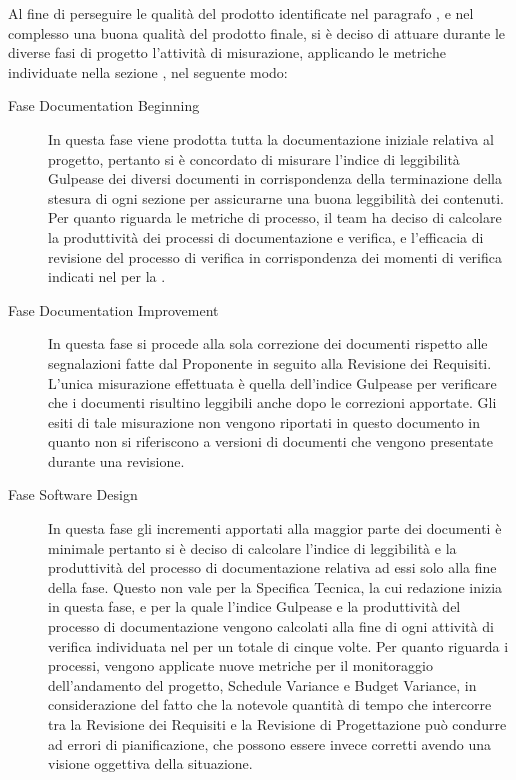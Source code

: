 		Al fine di perseguire le qualità del prodotto identificate nel paragrafo , e nel complesso una buona qualità del prodotto finale, si è deciso di attuare durante le diverse fasi di progetto l'attività di misurazione, applicando le metriche individuate nella sezione , nel seguente modo:
		\begin{description}
		\item[Fase Documentation Beginning] In questa fase viene prodotta tutta la documentazione iniziale relativa al progetto, pertanto si è concordato di misurare l'indice di leggibilità Gulpease dei diversi documenti in corrispondenza della terminazione della stesura di ogni sezione per assicurarne una buona leggibilità dei contenuti. Per quanto riguarda le metriche di processo, il team ha deciso di calcolare la produttività dei processi di documentazione e verifica, e l'efficacia di revisione del processo di verifica in corrispondenza dei momenti di verifica indicati nel  per la .
		\item[Fase Documentation Improvement] In questa fase si procede alla sola correzione dei documenti rispetto alle segnalazioni fatte dal Proponente in seguito alla Revisione dei Requisiti. L'unica misurazione effettuata è quella dell'indice Gulpease per verificare che i documenti risultino leggibili anche dopo le correzioni apportate. Gli esiti di tale misurazione non vengono riportati in questo documento in quanto non si riferiscono a versioni di documenti che vengono presentate durante una revisione. 
		\item[Fase Software Design] In questa fase gli incrementi apportati alla maggior parte dei documenti è minimale pertanto si è deciso di calcolare l'indice di leggibilità e la produttività del processo di documentazione relativa ad essi solo alla fine della fase. Questo non vale per la Specifica Tecnica, la cui redazione inizia in questa fase, e per la quale l'indice Gulpease e la produttività  del processo di documentazione vengono calcolati alla fine di ogni attività di verifica individuata nel  per un totale di cinque volte.
		Per quanto riguarda i processi, vengono applicate nuove metriche per il monitoraggio dell'andamento del progetto, Schedule Variance e Budget Variance, in considerazione del fatto che la notevole quantità di tempo che intercorre tra la Revisione dei Requisiti e la Revisione di Progettazione può condurre ad errori di pianificazione, che possono essere invece corretti avendo una visione oggettiva della situazione.

\end{description}
